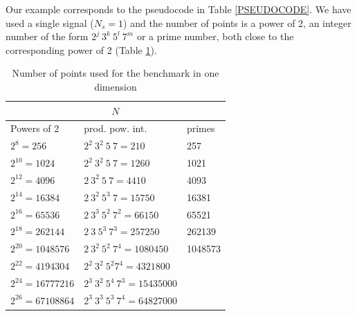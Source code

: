 \documentclass[12pt, a4paper]{article}
\begin{document}
Our example corresponds to the pseudocode in Table \ref{PSEUDOCODE}. We have used a single signal ($N_s=1$) and the number of points is a power of 2, an integer number of the form $2^j\ 3^k\ 5^l\ 7^m$ or a prime number, both close to the corresponding power of 2 (Table \ref{SIZES1D}).
\begin{table}[H]
\captionsetup{width=0.8\linewidth}
\centering
\begin{tabular}{|l|l|l|}
  \hline
  \multicolumn{3}{|c|}{$N$}\\
  \hline
  \hline
Powers of 2 & prod. pow. int. & primes\\ \hline
$2^8=256$	 & $2^2\ 3^2\ 5\ 7=210$	     & 257  \\ \hline
$2^{10}=1024$	 & $2^2\ 3^2\ 5\ 7=1260$	     & 1021  \\ \hline
$2^{12}=4096$	 & $2\ 3^2\ 5\ 7=4410$	     & 4093 \\ \hline
$2^{14}=16384$	 & $2\ 3^2\ 5^3\ 7=15750$	     & 16381 \\ \hline
$2^{16}=65536$	 & $2\ 3^3\ 5^2\ 7^2=66150$      & 65521 \\ \hline
$2^{18}=262144$	 & $2\ 3\ 5^3\ 7^3=257250$       & 262139 \\ \hline
$2^{20}=1048576$  & $2\ 3^2\ 5^2\ 7^4=1080450$    & 1048573 \\ \hline
$2^{22}=4194304$  & $2^2\ 3^2\ 5^2 7^4=4321800$  &	\\ \hline
$2^{24}=16777216$ & $2^3\ 3^2\ 5^4\ 7^3=15435000$ &	\\ \hline
$2^{26}=67108864$ & $2^3\ 3^3\ 5^3\ 7^4=64827000$ &\\ \hline
\end{tabular}
\caption{Number of points used for the benchmark in one dimension}\label{SIZES1D}
\end{table}
\end{document}
